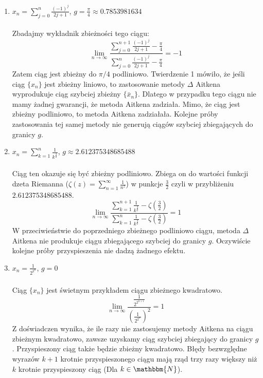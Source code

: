 \documentclass{article}
\begin{document}
\begin{enumerate}

\item $x_n = \sum\limits_{j=0}^n \frac{(-1)^j}{2j + 1}$, $g = \frac{\pi}{4} \approx 0.7853981634$ \\ \\
Zbadajmy wykładnik zbieżności tego ciągu:
\begin{equation*}
\lim_{n \to \infty} \frac{\sum\limits_{j=0}^{n+1} \frac{(-1)^j}{2j + 1} - \frac{\pi}{4}}{\sum\limits_{j=0}^{n} \frac{(-1)^j}{2j + 1} - \frac{\pi}{4}} = -1
\end{equation*}
Zatem ciąg jest zbieżny do $\pi/4$ podliniowo. Twierdzenie 1 mówiło, że jeśli ciąg $\{x_n\}$ jest zbieżny liniowo, to zastosowanie metody $\Delta$ Aitkena wyprodukuje ciąg szybciej zbieżny $\{\bar{x}_n\}$. Dlatego w przypadku tego ciągu nie mamy żadnej gwarancji, że metoda Aitkena zadziała. Mimo, że ciąg jest zbieżny podliniowo, to metoda Aitkena zadziałała. Kolejne próby zastosowania tej samej metody nie generują ciągów szybciej zbiegających do granicy $g$.

\item $x_n = \sum\limits_{k=1}^n \frac{1}{k^\frac{3}{2}}$, $g \approx 2.612375348685488$ \\ \\
Ciąg ten okazuje się być zbieżny podliniowo. Zbiega on do wartości funkcji dzeta Riemanna ($\zeta(z) = \sum\limits_{n=1}^{\infty} \frac{1}{n^z}$) w punkcje $\frac{3}{2}$ czyli w przybliżeniu $2.612375348685488$.
\begin{equation*}
\lim_{n \to \infty} \frac{\sum\limits_{k=1}^{n+1} \frac{1}{k^\frac{3}{2}} - \zeta(\frac{3}{2})}{\sum\limits_{k=1}^n \frac{1}{k^\frac{3}{2}} - \zeta(\frac{3}{2})} = 1
\end{equation*}
W przeciwieństwie do poprzedniego zbieżnego podliniowo ciągu, metoda $\Delta$ Aitkena nie produkuje ciągu zbiegającego szybciej do granicy $g$. Oczywiście kolejne próby przyspieszenia nie dadzą żadnego efektu.

\item $x_n = \frac{1}{2^{2^n}}$, $g = 0$ \\ \\
Ciąg $\{x_n\}$ jest świetnym przykładem ciągu zbieżnego kwadratowo.
\begin{equation*}
\lim_{n \to \infty} \frac{\frac{1}{2^{2^{n+1}}}}{(\frac{1}{2^{2^n}})^2} = 1
\end{equation*}
Z doświadczen wynika, że ile razy nie zastosujemy metody Aitkena na ciągu zbieżnym kwadratowo, zawsze uzyskamy ciąg szybciej zbiegający do granicy $g$. Przyspieszony ciąg także będzie zbieżny kwadratowo. Błędy bezwzględne wyrazów $k+1$ krotnie przyspieszonego ciągu mają rząd trzy razy większy niż $k$ krotnie przyspieszony ciąg (Dla $k \in \mathbbm{N}$).  


\end{enumerate}
\end{document}
